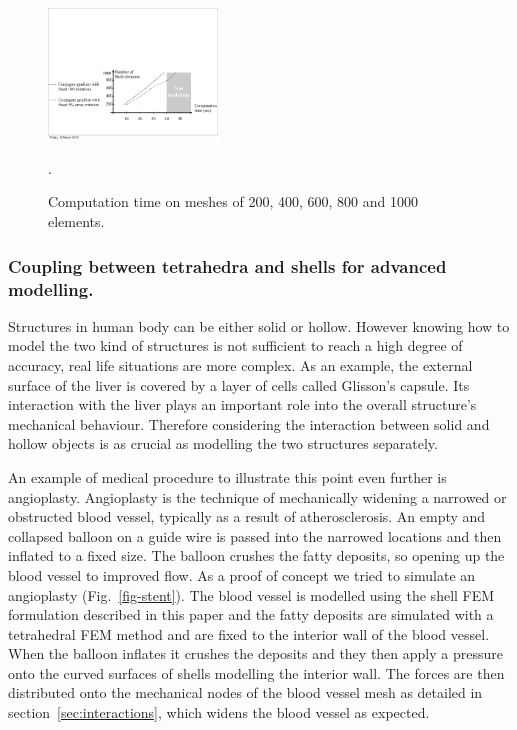 \documentclass{llncs}
\begin{document}
\begin{figure}
\centering
\includegraphics[height=3.5cm]{images/computation_time.pdf}
\caption {Computation time on meshes of 200, 400, 600, 800 and 1000 elements.}.
\label{fig-computation}
\end{figure}

\subsubsection{Coupling between tetrahedra and shells for advanced modelling.}
%
Structures in human body can be either solid or hollow. However knowing how to model the two kind of structures is not sufficient to reach a high degree of accuracy, real life situations are more complex. As an example, the external surface of the liver is covered by a layer of cells called Glisson's capsule. Its interaction with the liver plays an important role into the overall structure's mechanical behaviour. Therefore considering the interaction between solid and hollow objects is as crucial as modelling the two structures separately. 

An example of medical procedure to illustrate this point even further is angioplasty. Angioplasty is the technique of mechanically widening a narrowed or obstructed blood vessel, typically as a result of atherosclerosis. An empty and collapsed balloon on a guide wire is passed into the narrowed locations and then inflated to a fixed size. The balloon crushes the fatty deposits, so opening up the blood vessel to improved flow. As a proof of concept we tried to simulate an angioplasty (Fig.~\ref{fig-stent}). The blood vessel is modelled using the shell FEM formulation described in this paper and the fatty deposits are simulated with a tetrahedral FEM method and are fixed to the interior wall of the blood vessel. When the balloon inflates it crushes the deposits and they then apply a pressure onto the curved surfaces of shells modelling the interior wall. The forces are then distributed onto the mechanical nodes of the blood vessel mesh as detailed in section~\ref{sec:interactions}, which widens the blood vessel as expected. 
\end{document}
